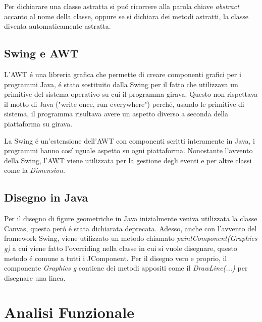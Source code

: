 \documentclass[a4paper,12pt]{article}
\begin{document}
Per dichiarare una classe astratta si puó ricorrere alla parola chiave \textit{abstract} accanto al nome della classe, oppure se si dichiara dei metodi astratti, la classe diventa automaticamente astratta.
\textcite{astratta}

\subsection{Swing e AWT}
L'AWT é una libreria grafica che permette di creare componenti grafici per i programmi Java, é stato sostituito dalla Swing per il fatto che utilizzava un primitive del sistema operativo su cui il programma girava. Questo non rispettava il motto di Java ("write once, run everywhere") perché, usando le primitive di sistema, il programma risultava avere un aspetto diverso a seconda della piattaforma su girava.

La Swing é un'estensione dell'AWT con componenti scritti interamente in Java, i programmi hanno cosí uguale aspetto su ogni piattaforma. Nonostante l'avvento della Swing, l'AWT viene utilizzata per la gestione degli eventi e per altre classi come la \textit{Dimension}.

\subsection{Disegno in Java}
Per il disegno di figure geometriche in Java inizialmente veniva utilizzata la classe Canvas, questa peró é stata dichiarata deprecata. Adesso, anche con l'avvento del framework Swing, viene utilizzato un metodo chiamato \textit{paintComponent(Graphics g)} a cui viene fatto l'overriding nella classe in cui si vuole disegnare, questo metodo é comune a tutti i JComponent. Per il disegno vero e proprio, il componente \textit{Graphics g} contiene dei metodi appositi come il \textit{DrawLine(...)} per disegnare una linea. 

\section{Analisi Funzionale}
\end{document}
